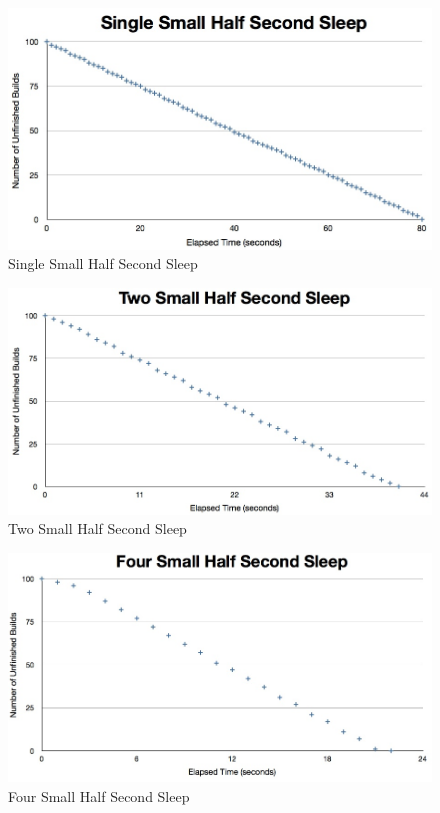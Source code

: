 \documentclass{scrartcl}
\begin{document}
\begin{figure}[here]
  \begin{center}
    \includegraphics[scale=0.45]{raw_data/sleep0.5/one_small/graph.jpg}
  \end{center}
  \caption{Single Small Half Second Sleep}
  \label{fig:sleephalf_one_small_queuelength}
\end{figure}

\begin{figure}[here]
  \begin{center}
    \includegraphics[scale=0.45]{raw_data/sleep0.5/two_small/graph.jpg}
  \end{center}
  \caption{Two Small Half Second Sleep}
  \label{fig:sleephalf_two_small_queuelength}
\end{figure}

\begin{figure}[here]
  \begin{center}
    \includegraphics[scale=0.45]{raw_data/sleep0.5/four_small/graph.jpg}
  \end{center}
  \caption{Four Small Half Second Sleep}
  \label{fig:sleephalf_four_small_queuelength}
\end{figure}
\end{document}
